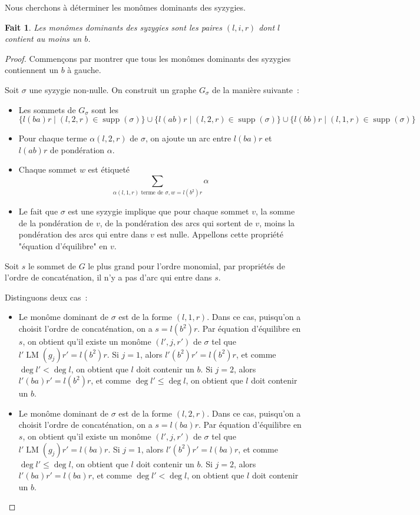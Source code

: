 \documentclass{article}
\newtheorem*{fact}{Fait}
\DeclareMathOperator{\LM}{LM}
\DeclareMathOperator{\supp}{supp}
\begin{document}
Nous cherchons à déterminer les monômes dominants des syzygies.
\begin{fact}
	Les monômes dominants des syzygies sont les paires $(l, i, r)$ dont $l$ contient au moins un $b$.
\end{fact}
\begin{proof}
	Commençons par montrer que tous les monômes dominants des syzygies contiennent un $b$ à gauche.
	
	Soit $\sigma$ une syzygie non-nulle.
	On construit un graphe $G_\sigma$ de la manière suivante~:
	\begin{itemize}
		\item Les sommets de $G_\sigma$ sont les 
		$$\{l(ba)r \;|\; (l, 2, r) \in \supp(\sigma)\} \cup \{l(ab)r \;|\; (l, 2, r) \in \supp(\sigma)\} \cup \{l(bb)r \;|\; (l, 1, r) \in \supp(\sigma)\}$$
		
		\item Pour chaque terme $\alpha(l, 2, r)$ de $\sigma$, on ajoute un arc entre $l(ba)r$ et $l(ab)r$ de pondération $\alpha$.
		\item Chaque sommet $w$ est étiqueté 
		$$\sum_{\alpha (l, 1, r) \mbox{ terme de } \sigma, w = l(b^2)r} \alpha$$
		\item Le fait que $\sigma$ est une syzygie implique que pour chaque sommet $v$, la somme de la pondération de $v$, de la pondération des arcs qui sortent de $v$, moins la pondération des arcs qui entre dans $v$ est nulle. Appellons cette propriété "équation d'équilibre" en $v$.
	\end{itemize}
	
	Soit $s$ le sommet de $G$ le plus grand pour l'ordre monomial, par propriétés de l'ordre de concaténation, il n'y a pas d'arc qui entre dans $s$.
	
	Distinguons deux cas~:
	\begin{itemize}
	\item Le monôme dominant de $\sigma$ est de la forme $(l, 1, r)$. Dans ce cas, puisqu'on a choisit l'ordre de concaténation, on a $s = l(b^2)r$. Par équation d'équilibre en $s$, on obtient qu'il existe un monôme $(l', j, r')$ de $\sigma$ tel que $l'\LM(g_j)r' = l(b^2)r$.
	Si $j = 1$, alors $l'(b^2)r' = l(b^2)r$, et comme $\deg{l'} < \deg{l}$, on obtient que $l$ doit contenir un $b$.
	Si $j = 2$, alors $l'(ba)r' = l(b^2)r$, et comme $\deg{l'} \leq \deg{l}$, on obtient que $l$ doit contenir un $b$.
	
	\item Le monôme dominant de $\sigma$ est de la forme $(l, 2, r)$. Dans ce cas, puisqu'on a choisit l'ordre de concaténation, on a $s = l(ba)r$. Par équation d'équilibre en $s$, on obtient qu'il existe un monôme $(l', j, r')$ de $\sigma$ tel que $l'\LM(g_j)r' = l(ba)r$.
	Si $j = 1$, alors $l'(b^2)r' = l(ba)r$, et comme $\deg{l'} \leq \deg{l}$, on obtient que $l$ doit contenir un $b$.
	Si $j = 2$, alors $l'(ba)r' = l(ba)r$, et comme $\deg{l'} < \deg{l}$, on obtient que $l$ doit contenir un $b$.
	\end{itemize}
	

\end{proof}
\end{document}
